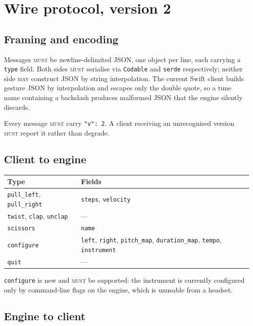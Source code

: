 \documentclass[11pt,a4paper]{article}
\newcommand{\MUST}{\textsc{must}}
\newcommand{\MAY}{\textsc{may}}
\theoremstyle{definition}
\theoremstyle{plain}
\theoremstyle{remark}
\begin{document}
\section{Wire protocol, version 2}
\label{sec:protocol}

\subsection{Framing and encoding}

Messages \MUST{} be newline-delimited JSON, one object per line, each carrying a \texttt{type}
field. Both sides \MUST{} serialise via \texttt{Codable} and \texttt{serde} respectively; neither
side \MAY{} construct JSON by string interpolation. The current Swift client builds gesture JSON by
interpolation and escapes only the double quote, so a tune name containing a backslash produces
malformed JSON that the engine silently discards.

Every message \MUST{} carry \texttt{"v": 2}. A client receiving an unrecognised version \MUST{}
report it rather than degrade.

\subsection{Client to engine}

\begin{center}
\begin{tabular}{ll}
\toprule
\textbf{Type} & \textbf{Fields} \\
\midrule
\texttt{pull\_left}, \texttt{pull\_right} & \texttt{steps}, \texttt{velocity} \\
\texttt{twist}, \texttt{clap}, \texttt{unclap} & --- \\
\texttt{scissors} & \texttt{name} \\
\texttt{configure} & \texttt{left}, \texttt{right}, \texttt{pitch\_map}, \texttt{duration\_map}, \texttt{tempo}, \texttt{instrument} \\
\texttt{quit} & --- \\
\bottomrule
\end{tabular}
\end{center}

\texttt{configure} is new and \MUST{} be supported: the instrument is currently configured only by
command-line flags on the engine, which is unusable from a headset.

\subsection{Engine to client}
\end{document}
